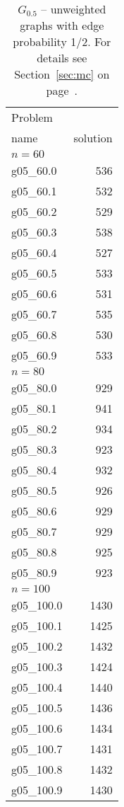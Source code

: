 \documentclass[a4paper, 12pt]{article}
\begin{document}
\begin{table} \begin{center}
\begin{tabular}{|l|r|}
\hline
Problem& \\
name & solution \\
\hline
\multicolumn{2}{|l|}{$n=60$}\\
\hline
g05\_60.0 & 536 \\
g05\_60.1 & 532 \\
g05\_60.2 & 529 \\
g05\_60.3 & 538 \\
g05\_60.4 & 527 \\
g05\_60.5 & 533 \\
g05\_60.6 & 531 \\
g05\_60.7 & 535 \\
g05\_60.8 & 530 \\
g05\_60.9 & 533 \\
\hline
\multicolumn{2}{|l|}{$n=80$}\\
\hline
g05\_80.0 & 929 \\
g05\_80.1 & 941 \\
g05\_80.2 & 934 \\
g05\_80.3 & 923 \\
g05\_80.4 & 932 \\
g05\_80.5 & 926 \\
g05\_80.6 & 929 \\
g05\_80.7 & 929 \\
g05\_80.8 & 925 \\
g05\_80.9 & 923 \\
\hline
\multicolumn{2}{|l|}{$n=100$}\\
\hline
g05\_100.0 & 1430 \\
g05\_100.1 & 1425 \\
g05\_100.2 & 1432 \\
g05\_100.3 & 1424 \\
g05\_100.4 & 1440 \\
g05\_100.5 & 1436 \\
g05\_100.6 & 1434 \\
g05\_100.7 & 1431 \\
g05\_100.8 & 1432 \\
g05\_100.9 & 1430 \\
\hline
\end{tabular}
\caption{$G_{0.5}$ -- unweighted graphs with edge probability 1/2. For
  details see Section~\ref{sec:mc} on
  page~\pageref{sec:mc}.} \label{tab:g05} 
\end{center} \end{table}
\end{document}
